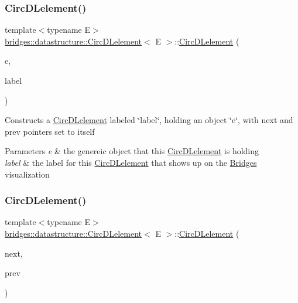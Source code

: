 \subsubsection{\texorpdfstring{Circ\+D\+Lelement()}{CircDLelement()}\hspace{0.1cm}{\footnotesize\ttfamily [2/4]}}
{\footnotesize\ttfamily template$<$typename E$>$ \\
\hyperlink{classbridges_1_1datastructure_1_1_circ_d_lelement}{bridges\+::datastructure\+::\+Circ\+D\+Lelement}$<$ E $>$\+::\hyperlink{classbridges_1_1datastructure_1_1_circ_d_lelement}{Circ\+D\+Lelement} (\begin{DoxyParamCaption}\item[{E}]{e,  }\item[{string}]{label }\end{DoxyParamCaption})\hspace{0.3cm}{\ttfamily [inline]}}

Constructs a \hyperlink{classbridges_1_1datastructure_1_1_circ_d_lelement}{Circ\+D\+Lelement} labeled \char`\"{}label\char`\"{}, holding an object \char`\"{}e\char`\"{}, with next and prev pointers set to itself 
\begin{DoxyParams}{Parameters}
{\em e} & the genereic object that this \hyperlink{classbridges_1_1datastructure_1_1_circ_d_lelement}{Circ\+D\+Lelement} is holding \\
\hline
{\em label} & the label for this \hyperlink{classbridges_1_1datastructure_1_1_circ_d_lelement}{Circ\+D\+Lelement} that shows up on the \hyperlink{classbridges_1_1_bridges}{Bridges} visualization \\
\hline
\end{DoxyParams}
\mbox{\label{classbridges_1_1datastructure_1_1_circ_d_lelement_a8db4aa80feb388d5206d657d80385f16}} 
\subsubsection{\texorpdfstring{Circ\+D\+Lelement()}{CircDLelement()}\hspace{0.1cm}{\footnotesize\ttfamily [3/4]}}
{\footnotesize\ttfamily template$<$typename E$>$ \\
\hyperlink{classbridges_1_1datastructure_1_1_circ_d_lelement}{bridges\+::datastructure\+::\+Circ\+D\+Lelement}$<$ E $>$\+::\hyperlink{classbridges_1_1datastructure_1_1_circ_d_lelement}{Circ\+D\+Lelement} (\begin{DoxyParamCaption}\item[{\hyperlink{classbridges_1_1datastructure_1_1_circ_d_lelement}{Circ\+D\+Lelement}$<$ E $>$}]{next,  }\item[{\hyperlink{classbridges_1_1datastructure_1_1_circ_d_lelement}{Circ\+D\+Lelement}$<$ E $>$}]{prev }\end{DoxyParamCaption})\hspace{0.3cm}{\ttfamily [inline]}}

